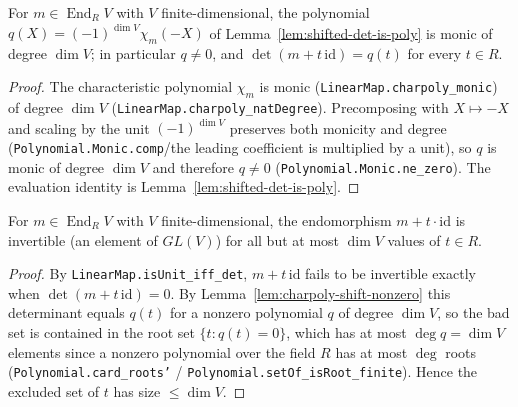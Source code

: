 \begin{lemma}
    \label{lem:charpoly-shift-nonzero}
    For $m \in \operatorname{End}_R V$ with $V$ finite-dimensional, the polynomial $q(X) =
    (-1)^{\dim V}\chi_m(-X)$ of Lemma~\ref{lem:shifted-det-is-poly} is monic of degree $\dim V$; in
    particular $q \ne 0$, and $\det(m + t\,\mathrm{id}) = q(t)$ for every $t \in R$.
\end{lemma}
\begin{proof}
    The characteristic polynomial $\chi_m$ is monic (\texttt{LinearMap.charpoly\_monic}) of degree
    $\dim V$ (\texttt{LinearMap.charpoly\_natDegree}). Precomposing with $X \mapsto -X$ and scaling by the
    unit $(-1)^{\dim V}$ preserves both monicity and degree (\texttt{Polynomial.Monic.comp}/the leading
    coefficient is multiplied by a unit), so $q$ is monic of degree $\dim V$ and therefore $q \ne 0$
    (\texttt{Polynomial.Monic.ne\_zero}). The evaluation identity is Lemma~\ref{lem:shifted-det-is-poly}.
\end{proof}

\begin{lemma}
    \label{lem:shifted-invertible}
    \leanok
    For $m \in \operatorname{End}_R V$ with $V$ finite-dimensional, the endomorphism
    $m + t\cdot\mathrm{id}$ is invertible (an element of $GL(V)$) for all but at most $\dim V$ values of
    $t \in R$.
\end{lemma}
\begin{proof}
    By \texttt{LinearMap.isUnit\_iff\_det}, $m + t\,\mathrm{id}$ fails to be invertible exactly when
    $\det(m + t\,\mathrm{id}) = 0$. By Lemma~\ref{lem:charpoly-shift-nonzero} this determinant equals
    $q(t)$ for a nonzero polynomial $q$ of degree $\dim V$, so the bad set is contained in the root set
    $\{t : q(t) = 0\}$, which has at most $\deg q = \dim V$ elements since a nonzero polynomial over the
    field $R$ has at most $\deg$ roots (\texttt{Polynomial.card\_roots'} / \texttt{Polynomial.setOf\_isRoot\_finite}).
    Hence the excluded set of $t$ has size $\le \dim V$.
\end{proof}


